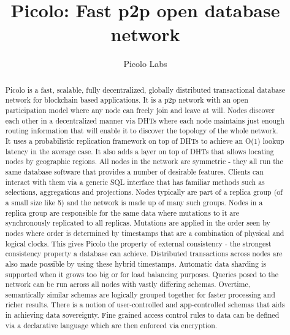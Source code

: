 \documentclass[preprint,10pt]{elsarticle}
\theoremstyle{definition}
\begin{document}
\begin{frontmatter}


\title{Picolo: Fast p2p open database network}

\author{Picolo Labs}
\address{San Francisco, California}


\begin{abstract}
Picolo is a fast, scalable, fully decentralized, globally distributed transactional database network for blockchain based applications. It is a p2p network with an open participation model where any node can freely join and leave at will. Nodes discover each other in a decentralized manner via DHTs where each node maintains just enough routing information that will enable it to discover the topology of the whole network. It uses a probabilistic replication framework on top of DHTs to achieve an O(1) lookup latency in the average case. It also adds a layer on top of DHTs that allows locating nodes by geographic regions.
\newline
\newline
All nodes in the network are symmetric - they all run the same database software that provides a number of desirable features. Clients can interact with them via a generic SQL interface that has familiar methods such as selections, aggregations and projections. Nodes typically are part of a replica group (of a small size like 5) and the network is made up of many such groups. Nodes in a replica group are responsible for the same data where mutations to it are synchronously replicated to all replicas. Mutations are applied in the order seen by nodes where order is determined by timestamps that are a combination of physical and logical clocks. This gives Picolo the property of external consistency - the strongest consistency property a database can achieve. Distributed transactions across nodes are also made possible by using these hybrid timestamps. Automatic data sharding is supported when it grows too big or for load balancing purposes. Queries posed to the network can be run across all nodes with vastly differing schemas. Overtime, semantically similar schemas are logically grouped together for faster processing and richer results. There is a notion of \textsf{user-controlled} and \textsf{app-controlled} schemas that aids in achieving data sovereignty. Fine grained access control rules to data can be defined via a declarative language which are then enforced via encryption.

\end{abstract}
\end{frontmatter}
\end{document}
